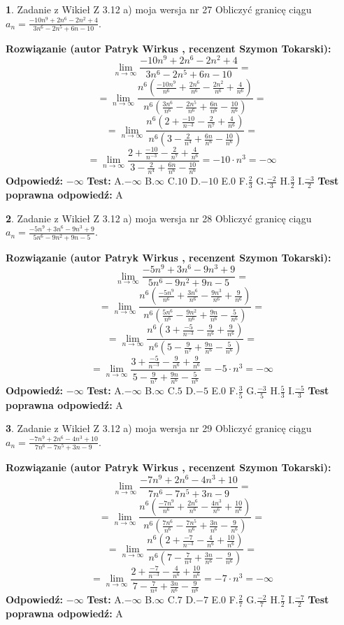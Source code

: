 \documentclass[12pt, a4paper]{article}
\theoremstyle{definition} %
\newtheorem{zad}{}
\newcommand{\zadStart}[1]{\begin{zad}#1\newline}
\newcommand{\zadStop}{\end{zad}}
\newcommand{\rozwStart}[2]{\noindent \textbf{Rozwiązanie (autor #1 , recenzent #2): }\newline}
\newcommand{\rozwStop}{\newline}
\newcommand{\odpStart}{\noindent \textbf{Odpowiedź:}\newline}
\newcommand{\odpStop}{\newline}
\newcommand{\testStart}{\noindent \textbf{Test:}\newline}
\newcommand{\testStop}{\newline}
\newcommand{\kluczStart}{\noindent \textbf{Test poprawna odpowiedź:}\newline}
\newcommand{\kluczStop}{\newline}
\begin{document}
\zadStart{Zadanie z Wikieł Z 3.12 a) moja wersja nr 27}
Obliczyć granicę ciągu $a_{n}=\frac{-10n^{9}+2n^{6}-2n^{2}+4}{3n^{6}-2n^{5}+6n-10}$.
\zadStop
\rozwStart{Patryk Wirkus}{Szymon Tokarski}
$$\lim\limits_{n\to\infty}\frac{-10n^{9}+2n^{6}-2n^{2}+4}{3n^{6}-2n^{5}+6n-10}=$$
$$=\lim\limits_{n\to\infty}\frac{n^{6}\left(\frac{-10n^{9}}{n^{6}}+\frac{2n^{6}}{n^{6}}-\frac{2n^{2}}{n^{6}}+\frac{4}{n^{6}}\right)}{n^{6}\left(\frac{3n^{6}}{n^{6}}-\frac{2n^{5}}{n^{6}}+\frac{6n}{n^{6}}-\frac{10}{n^{6}}\right)}=$$
$$=\lim\limits_{n\to\infty}\frac{n^{6}\left(2+\frac{-10}{n^{-3}}-\frac{2}{n^{7}}+\frac{4}{n^{6}}\right)}
{n^{6}\left(3-\frac{2}{n^{4}}+\frac{6n}{n^{6}}-\frac{10}{n^{6}}\right)}=$$
$$=\lim\limits_{n\to\infty}\frac{2+\frac{-10}{n^{-3}}-\frac{2}{n^{7}}+\frac{4}{n^{6}}}{3-\frac{2}{n^{4}}+\frac{6n}{n^{6}}-\frac{10}{n^{6}}}=-10\cdot n^{3} = -\infty$$
\rozwStop
\odpStart
$-\infty$
\odpStop
\testStart
A.$-\infty$
B.$\infty$
C.$10$
D.$-10$
E.$0$
F.$\frac{2}{3}$
G.$\frac{-2}{3}$
H.$\frac{3}{2}$
I.$\frac{-3}{2}$
\testStop
\kluczStart
A
\kluczStop



\zadStart{Zadanie z Wikieł Z 3.12 a) moja wersja nr 28}
Obliczyć granicę ciągu $a_{n}=\frac{-5n^{9}+3n^{6}-9n^{3}+9}{5n^{6}-9n^{2}+9n-5}$.
\zadStop
\rozwStart{Patryk Wirkus}{Szymon Tokarski}
$$\lim\limits_{n\to\infty}\frac{-5n^{9}+3n^{6}-9n^{3}+9}{5n^{6}-9n^{2}+9n-5}=$$
$$=\lim\limits_{n\to\infty}\frac{n^{6}\left(\frac{-5n^{9}}{n^{6}}+\frac{3n^{6}}{n^{6}}-\frac{9n^{3}}{n^{6}}+\frac{9}{n^{6}}\right)}{n^{6}\left(\frac{5n^{6}}{n^{6}}-\frac{9n^{2}}{n^{6}}+\frac{9n}{n^{6}}-\frac{5}{n^{6}}\right)}=$$
$$=\lim\limits_{n\to\infty}\frac{n^{6}\left(3+\frac{-5}{n^{-3}}-\frac{9}{n^{6}}+\frac{9}{n^{6}}\right)}
{n^{6}\left(5-\frac{9}{n^{7}}+\frac{9n}{n^{6}}-\frac{5}{n^{6}}\right)}=$$
$$=\lim\limits_{n\to\infty}\frac{3+\frac{-5}{n^{-3}}-\frac{9}{n^{6}}+\frac{9}{n^{6}}}{5-\frac{9}{n^{7}}+\frac{9n}{n^{6}}-\frac{5}{n^{6}}}=-5\cdot n^{3} = -\infty$$
\rozwStop
\odpStart
$-\infty$
\odpStop
\testStart
A.$-\infty$
B.$\infty$
C.$5$
D.$-5$
E.$0$
F.$\frac{3}{5}$
G.$\frac{-3}{5}$
H.$\frac{5}{3}$
I.$\frac{-5}{3}$
\testStop
\kluczStart
A
\kluczStop



\zadStart{Zadanie z Wikieł Z 3.12 a) moja wersja nr 29}
Obliczyć granicę ciągu $a_{n}=\frac{-7n^{9}+2n^{6}-4n^{3}+10}{7n^{6}-7n^{5}+3n-9}$.
\zadStop
\rozwStart{Patryk Wirkus}{Szymon Tokarski}
$$\lim\limits_{n\to\infty}\frac{-7n^{9}+2n^{6}-4n^{3}+10}{7n^{6}-7n^{5}+3n-9}=$$
$$=\lim\limits_{n\to\infty}\frac{n^{6}\left(\frac{-7n^{9}}{n^{6}}+\frac{2n^{6}}{n^{6}}-\frac{4n^{3}}{n^{6}}+\frac{10}{n^{6}}\right)}{n^{6}\left(\frac{7n^{6}}{n^{6}}-\frac{7n^{5}}{n^{6}}+\frac{3n}{n^{6}}-\frac{9}{n^{6}}\right)}=$$
$$=\lim\limits_{n\to\infty}\frac{n^{6}\left(2+\frac{-7}{n^{-3}}-\frac{4}{n^{6}}+\frac{10}{n^{6}}\right)}
{n^{6}\left(7-\frac{7}{n^{4}}+\frac{3n}{n^{6}}-\frac{9}{n^{6}}\right)}=$$
$$=\lim\limits_{n\to\infty}\frac{2+\frac{-7}{n^{-3}}-\frac{4}{n^{6}}+\frac{10}{n^{6}}}{7-\frac{7}{n^{4}}+\frac{3n}{n^{6}}-\frac{9}{n^{6}}}=-7\cdot n^{3} = -\infty$$
\rozwStop
\odpStart
$-\infty$
\odpStop
\testStart
A.$-\infty$
B.$\infty$
C.$7$
D.$-7$
E.$0$
F.$\frac{2}{7}$
G.$\frac{-2}{7}$
H.$\frac{7}{2}$
I.$\frac{-7}{2}$
\testStop
\kluczStart
A
\kluczStop
\end{document}
